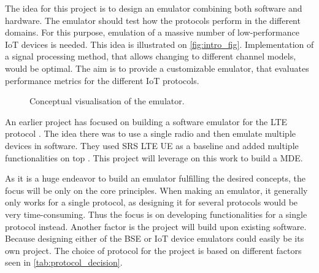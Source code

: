 The idea for this project is to design an emulator combining both software and hardware. The emulator should test how the protocols perform in the different domains. For this purpose, emulation of a massive number of low-performance \gls{IoT} devices is needed. This idea is illustrated on \autoref{fig:intro_fig}. Implementation of a signal processing method, that allows changing to different channel models, would be optimal. The aim is to provide a customizable emulator, that evaluates performance metrics for the different \gls{IoT} protocols. 

\begin{figure}[H]
\centering
\resizebox{0.5\textwidth}{!}{
}
\caption{Conceptual visualisation of the emulator.}
\label{fig:intro_fig}
\end{figure}

An earlier project has focused on building a software emulator for the LTE protocol \citep{thesis_report}. The idea there was to use a single radio and then emulate multiple devices in software. They used SRS LTE UE as a baseline and added multiple functionalities on top \citep{thesis_report}. This project will leverage on this work to build a \gls{MDE}.

As it is a huge endeavor to build an emulator fulfilling the desired concepts, the focus will be only on the core principles. When making an emulator, it generally only works for a single protocol, as designing it for several protocols would be very time-consuming. Thus the focus is on developing functionalities for a single protocol instead. Another factor is the project will build upon existing software. Because designing either of the \gls{BSE} or \gls{IoT} device emulators could easily be its own project. The choice of protocol for the project is based on different factors seen in \autoref{tab:protocol_decision}.

